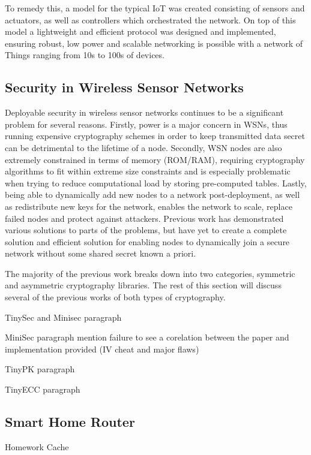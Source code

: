 \documentclass[conference]{./sty/IEEEtran}
\begin{document}
To remedy this, a model for the typical IoT was created consisting of sensors and actuators, as well as controllers which orchestrated the network. On top of this model a lightweight and efficient protocol was designed and implemented, ensuring robust, low power and scalable networking is possible with a network of Things ranging from 10s to 100s of devices.



\subsection{Security in Wireless Sensor Networks} %
\label{sub:existing_security}
Deployable security in wireless sensor networks continues to be a significant problem for several reasons. Firstly, power is a major concern in WSNs, thus running expensive cryptography schemes in order to keep transmitted data secret can be detrimental to the lifetime of a node. Secondly, WSN nodes are also extremely constrained in terms of memory (ROM/RAM), requiring cryptography algorithms to fit within extreme size constraints and is especially problematic when trying to reduce computational load by storing pre-computed tables. Lastly, being able to dynamically add new nodes to a network post-deployment, as well as redistribute new keys for the network, enables the network to scale, replace failed nodes and protect against attackers. Previous work has demonstrated various solutions to parts of the problems, but have yet to create a complete solution and efficient solution for enabling nodes to dynamically join a secure network without some shared secret known a priori.

The majority of the previous work breaks down into two categories, symmetric and asymmetric cryptography libraries. The rest of this section will discuss several of the previous works of both types of cryptography.

TinySec and Minisec paragraph \cite{TinySec}

MiniSec paragraph \cite{MiniSec} mention failure to see a corelation between the paper and implementation provided (IV cheat and major flaws)

TinyPK paragraph \cite{TinyPK}

TinyECC paragraph \cite{TinyECC}

\subsection{Smart Home Router} %
\label{sub:integration}
Homework Cache \cite{InformationPlane} \cite{DEBSChallenge}
\end{document}
